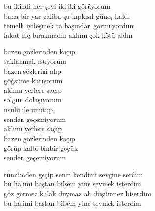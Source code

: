 \documentclass[10pt, openright, oneside]{memoir}
\theoremstyle{definition}
\begin{document}
%
\newpage
{}
\vspace*{\fill}
\settowidth{\versewidth}{bana bir yar galiba şu kıpkızıl güneş kaldı}
\begin{cverse}
  bu ikindi her şeyi iki iki görüyorum \\
  bana bir yar galiba şu kıpkızıl güneş kaldı \\
  temelli iyileşmek ta başından görmüyordum \\
  fakat hiç bırakmadın aklımı çok kötü aldın
\end{cverse}
\vspace*{\fill}
%
\newpage
{}
\vspace*{\fill}
\settowidth{\versewidth}{görüp kalbi binbir göçük}
\begin{cverse}
  bazen gözlerinden kaçıp \\
  saklanmak istiyorum \\
  bazen sözlerini alıp \\
  göğsüme katıyorum \\
  aklımı yerlere saçıp \\
  solgun dolaşıyorum \\
  usulü ile unutup \\
  senden geçemiyorum \\
  aklımı yerlere saçıp \\
  bazen gözlerinden kaçıp \\
  görüp kalbi binbir göçük \\
  senden geçemiyorum
\end{cverse}
\vspace*{\fill}
%
\newpage
{}
\vspace*{\fill}
\settowidth{\versewidth}{bu halimi baştan bilsem yine sevmek isterdim}
\begin{cverse}
  tümümden geçip senin kendimi sevgine serdim \\
  bu halimi baştan bilsem yine sevmek isterdim \\
  göz görmez kulak duymaz ah düşünmez biserdim \\
  bu halimi baştan bilsem yine sevmek isterdim \\
\end{cverse}
\vspace*{\fill}
%
\newpage
{}
\vspace*{\fill}
\end{document}

